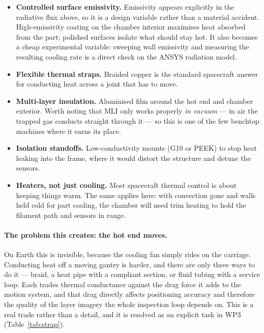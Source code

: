 \documentclass[11pt,a4paper]{article}
\begin{document}
\begin{itemize}
  \item \textbf{Controlled surface emissivity.} Emissivity appears explicitly in
        the radiative flux above, so it is a design variable rather than a
        material accident. High-emissivity coating on the chamber interior
        maximises heat absorbed from the part; polished surfaces isolate what
        should stay hot. It also becomes a cheap experimental variable: sweeping
        wall emissivity and measuring the resulting cooling rate is a direct
        check on the ANSYS radiation model.
  \item \textbf{Flexible thermal straps.} Braided copper is the standard
        spacecraft answer for conducting heat across a joint that has to move.
  \item \textbf{Multi-layer insulation.} Aluminised film around the hot end and
        chamber exterior. Worth noting that MLI only works properly \emph{in
        vacuum} --- in air the trapped gas conducts straight through it --- so
        this is one of the few benchtop machines where it earns its place.
  \item \textbf{Isolation standoffs.} Low-conductivity mounts (G10 or PEEK) to
        stop heat leaking into the frame, where it would distort the structure
        and detune the sensors.
  \item \textbf{Heaters, not just cooling.} Most spacecraft thermal control is
        about keeping things warm. The same applies here: with convection gone
        and walls held cold for part cooling, the chamber will need trim heating
        to hold the filament path and sensors in range.
\end{itemize}

\paragraph{The problem this creates: the hot end moves.} On Earth this is
invisible, because the cooling fan simply rides on the carriage. Conducting heat
off a moving gantry is harder, and there are only three ways to do it --- braid,
a heat pipe with a compliant section, or fluid tubing with a service loop. Each
trades thermal conductance against the drag force it adds to the motion system,
and that drag directly affects positioning accuracy and therefore the quality of
the layer imagery the whole inspection loop depends on. This is a real trade
rather than a detail, and it is resolved as an explicit task in WP3
(Table~\ref{tab:strap}).
\end{document}
